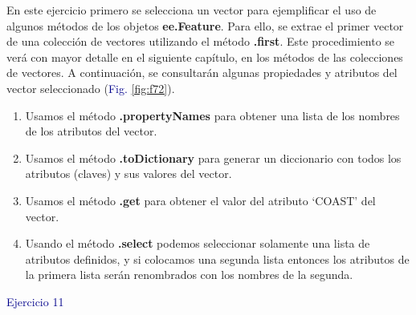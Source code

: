 \documentclass[
  12pt,
  letterpaper,
  twoside]{book}
\providecommand{\tightlist}{%
  \setlength{\itemsep}{0pt}\setlength{\parskip}{0pt}}
\newcommand\boldpurple[1]{\textcolor{darkpurple}{\textbf{#1}}}
\begin{document}
En este ejercicio primero se selecciona un vector para ejemplificar el uso de algunos métodos de los objetos \boldpurple{ee.Feature}. Para ello, se extrae el primer vector de una colección de vectores utilizando el método \boldpurple{.first}. Este procedimiento se verá con mayor detalle en el siguiente capítulo, en los métodos de las colecciones de vectores. A continuación, se consultarán algunas propiedades y atributos del vector seleccionado (\textcolor{darkblue}{Fig.} \ref{fig:f72}).

\begin{enumerate}
\def\labelenumi{\arabic{enumi}.}
\tightlist
\item
  Usamos el método \boldpurple{.propertyNames} para obtener una lista de los nombres de los atributos del vector.
\item
  Usamos el método \boldpurple{.toDictionary} para generar un diccionario con todos los atributos (claves) y sus valores del vector.
\item
  Usamos el método \boldpurple{.get} para obtener el valor del atributo `COAST' del vector.
\item
  Usando el método \boldpurple{.select} podemos seleccionar solamente una lista de atributos definidos, y si colocamos una segunda lista entonces los atributos de la primera lista serán renombrados con los nombres de la segunda.
\end{enumerate}

\textcolor{darkblue}{Ejercicio 11}
\end{document}
